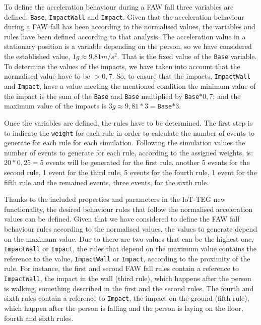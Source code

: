 \documentclass[journal]{IEEEtran}
\begin{document}
To define the acceleration behaviour during a FAW fall three variables are defined: \texttt{\small{Base}}, 
\texttt{\small{ImpactWall}} and \texttt{\small{Impact}}. Given that the acceleration behaviour during a FAW fall has
been according to the normalised values, the variables and rules have been defined according to 
that analysis. The acceleration value in a stationary position is a variable depending on the person, so 
we have considered the established value, $1g\approx9.81m/s^{2}$. That is the fixed value of the 
\texttt{\small{Base}} variable. To determine the values of the impacts, we have taken into account that the 
normalised value have to be $> 0,7$. So, to ensure that the impacts, \texttt{\small{ImpactWall}} and 
\texttt{\small{Impact}}, have a value meeting the mentioned condition the minimum value of the impact is the 
sum of the \texttt{\small{Base}} and \texttt{\small{Base}} multiplied by \texttt{\small{Base}}$*0,7$; and the maximum value of the
impacts is $3g\approx9,81*3=$\texttt{\small{Base}}$*3$.

Once the variables are defined, the rules have to be determined. The first step is to indicate the 
\texttt{\small{weight}} for each rule in order to calculate the number of events to generate for each rule for 
each simulation. Following the simulation values the number of events to generate for each rule, according 
to the assigned weights, is: $20 * 0,25 = 5$ events will be generated for the first rule, another 5 events 
for the second rule, 1 event for the third rule, 5 events for the fourth rule, 1 event for the fifth
rule and the remained events, three events, for the sixth rule. 

Thanks to the included properties and parameters in the IoT-TEG new functionality, the desired behaviour rules that
follow the normalised acceleration values can be defined. Given that we have considered to define the FAW fall behaviour
rules according to the normalised values, the values to generate depend on the maximum value. Due to there are two 
values that can be the highest one, \texttt{\small{ImpactWall}} or \texttt{\small{Impact}}, the rules that depend on the maximum 
value contains the reference to the value, \texttt{\small{ImpactWall}} or \texttt{\small{Impact}}, according to the proximity
of the rule. For instance, the first and second FAW fall rules contain a reference to \texttt{\small{ImpactWall}}, the impact 
in the wall (third rule), which happens after the person is walking, something described in the first and the second rules.
The fourth and sixth rules contain a reference to \texttt{\small{Impact}}, the impact on the ground (fifth rule), which happen
after the person is falling and the person is laying on the floor, fourth and sixth rules.
\end{document}
